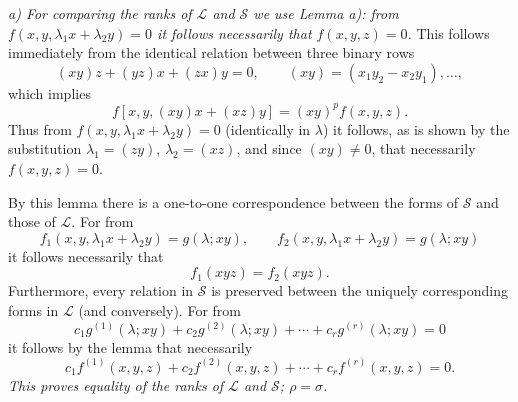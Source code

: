 \emph{a) For comparing the ranks of $\mathcal L$ and $\mathcal S$ we use Lemma a): from $f(x,y,\lambda_1x+\lambda_2y)=0$ it follows necessarily that $f(x,y,z)=0$.} This follows immediately from the identical relation between three binary rows
\[
  (xy)z+(yz)x+(zx)y=0,
  \qquad (xy)=(x_1y_2-x_2y_1),\ldots,
\]
which implies
\[
  f[x,y,(xy)x+(xz)y]=(xy)^p f(x,y,z).
\]
Thus from $f(x,y,\lambda_1x+\lambda_2y)=0$ (identically in $\lambda$) it follows, as is shown by the substitution $\lambda_1=(zy)$, $\lambda_2=(xz)$, and since $(xy)\ne0$, that necessarily $f(x,y,z)=0$.

By this lemma there is a one-to-one correspondence between the forms of $\mathcal S$ and those of $\mathcal L$. For from
\[
  f_1(x,y,\lambda_1x+\lambda_2y)=g(\lambda;xy),\qquad
  f_2(x,y,\lambda_1x+\lambda_2y)=g(\lambda;xy)
\]
it follows necessarily that
\[
  f_1(xyz)=f_2(xyz).
\]
Furthermore, every relation in $\mathcal S$ is preserved between the uniquely corresponding forms in $\mathcal L$ (and conversely). For from
\[
  c_1g^{(1)}(\lambda;xy)+c_2g^{(2)}(\lambda;xy)+\cdots+c_rg^{(r)}(\lambda;xy)=0
\]
it follows by the lemma that necessarily
\[
  c_1f^{(1)}(x,y,z)+c_2f^{(2)}(x,y,z)+\cdots+c_rf^{(r)}(x,y,z)=0.
\]
\emph{This proves equality of the ranks of $\mathcal L$ and $\mathcal S$; $\rho=\sigma$.}

